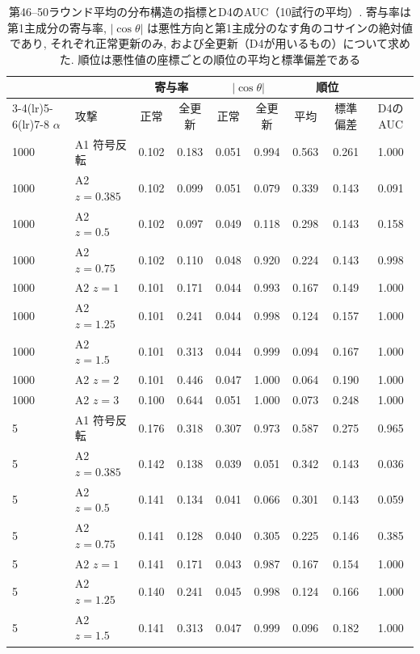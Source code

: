\documentclass[a4j, twocolumn, dvipdfmx]{jsarticle}
\begin{document}
\begin{table}[t]
\centering
\caption{第46--50ラウンド平均の分布構造の指標とD4のAUC（10試行の平均）. 寄与率は第1主成分の寄与率, $|\cos\theta|$ は悪性方向と第1主成分のなす角のコサインの絶対値であり, それぞれ正常更新のみ, および全更新（D4が用いるもの）について求めた. 順位は悪性値の座標ごとの順位の平均と標準偏差である}
\label{tab:structure}
\small
\begin{tabular}{@{}llccccccc@{}}
\toprule
 & & \multicolumn{2}{c}{寄与率} & \multicolumn{2}{c}{$|\cos\theta|$} & \multicolumn{2}{c}{順位} & \\
\cmidrule(lr){3-4}\cmidrule(lr){5-6}\cmidrule(lr){7-8}
$\alpha$ & 攻撃 & 正常 & 全更新 & 正常 & 全更新 & 平均 & 標準偏差 & D4のAUC \\
\midrule
1000 & A1 符号反転 & 0.102 & 0.183 & 0.051 & 0.994 & 0.563 & 0.261 & 1.000 \\
1000 & A2 $z{=}0.385$ & 0.102 & 0.099 & 0.051 & 0.079 & 0.339 & 0.143 & 0.091 \\
1000 & A2 $z{=}0.5$ & 0.102 & 0.097 & 0.049 & 0.118 & 0.298 & 0.143 & 0.158 \\
1000 & A2 $z{=}0.75$ & 0.102 & 0.110 & 0.048 & 0.920 & 0.224 & 0.143 & 0.998 \\
1000 & A2 $z{=}1$ & 0.101 & 0.171 & 0.044 & 0.993 & 0.167 & 0.149 & 1.000 \\
1000 & A2 $z{=}1.25$ & 0.101 & 0.241 & 0.044 & 0.998 & 0.124 & 0.157 & 1.000 \\
1000 & A2 $z{=}1.5$ & 0.101 & 0.313 & 0.044 & 0.999 & 0.094 & 0.167 & 1.000 \\
1000 & A2 $z{=}2$ & 0.101 & 0.446 & 0.047 & 1.000 & 0.064 & 0.190 & 1.000 \\
1000 & A2 $z{=}3$ & 0.100 & 0.644 & 0.051 & 1.000 & 0.073 & 0.248 & 1.000 \\
\midrule
5 & A1 符号反転 & 0.176 & 0.318 & 0.307 & 0.973 & 0.587 & 0.275 & 0.965 \\
5 & A2 $z{=}0.385$ & 0.142 & 0.138 & 0.039 & 0.051 & 0.342 & 0.143 & 0.036 \\
5 & A2 $z{=}0.5$ & 0.141 & 0.134 & 0.041 & 0.066 & 0.301 & 0.143 & 0.059 \\
5 & A2 $z{=}0.75$ & 0.141 & 0.128 & 0.040 & 0.305 & 0.225 & 0.146 & 0.385 \\
5 & A2 $z{=}1$ & 0.141 & 0.171 & 0.043 & 0.987 & 0.167 & 0.154 & 1.000 \\
5 & A2 $z{=}1.25$ & 0.140 & 0.241 & 0.045 & 0.998 & 0.124 & 0.166 & 1.000 \\
5 & A2 $z{=}1.5$ & 0.141 & 0.313 & 0.047 & 0.999 & 0.096 & 0.182 & 1.000 \\

\end{tabular}
\end{table}
\end{document}
